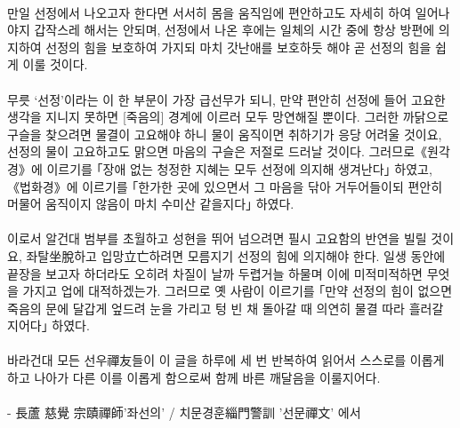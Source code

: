 \documentclass[12pt, a4paper, oneside]{book}
\begin{document}
\paragraph{}
만일 선정에서 나오고자 한다면 서서히 몸을 움직임에 
편안하고도 자세히 하여 일어나야지 갑작스레 해서는 안되며, 
선정에서 나온 후에는 일체의 시간 중에 항상 방편에 의지하여 
선정의 힘을 보호하여 가지되 
마치 갓난애를 보호하듯 해야 곧 선정의 힘을 쉽게 이룰 것이다.

\paragraph{}
무릇 ‘선정’이라는 이 한 부문이 가장 급선무가 되니, 
만약 편안히 선정에 들어 고요한 생각을 지니지 못하면 
[죽음의] 경계에 이르러 모두 망연해질 뿐이다. 
그러한 까닭으로 구슬을 찾으려면 물결이 고요해야 하니 
물이 움직이면 취하기가 응당 어려울 것이요, 
선정의 물이 고요하고도 맑으면 마음의 구슬은 저절로 드러날 것이다. 
그러므로《원각경》에 이르기를 
｢장애 없는 청정한 지혜는 모두 선정에 의지해 생겨난다｣ 하였고,
《법화경》에 이르기를 
｢한가한 곳에 있으면서 그 마음을 닦아 거두어들이되 
편안히 머물어 움직이지 않음이 마치 수미산 같을지다｣ 하였다.

\paragraph{}
이로서 알건대 범부를 초월하고 성현을 뛰어 넘으려면 
필시 고요함의 반연을 빌릴 것이요, 
좌탈坐脫하고 입망立亡하려면 모름지기 선정의 힘에 의지해야 한다. 
일생 동안에 끝장을 보고자 하더라도 오히려 차질이 날까 두렵거늘 
하물며 이에 미적미적하면 무엇을 가지고 업에 대적하겠는가. 
그러므로 옛 사람이 이르기를 ｢만약 선정의 힘이 없으면 
죽음의 문에 달갑게 엎드려 눈을 가리고 텅 빈 채 돌아갈 때 
의연히 물결 따라 흘러갈 지어다｣ 하였다.

\paragraph{}
바라건대 모든 선우禪友들이 이 글을 하루에 세 번 반복하여 읽어서 
스스로를 이롭게 하고 나아가 
다른 이를 이롭게 함으로써 함께 바른 깨달음을 이룰지어다.


\paragraph{}
- 長蘆 慈覺 宗賾禪師'좌선의' / 치문경훈緇門警訓 '선문禪文' 에서 



%
\end{document}
